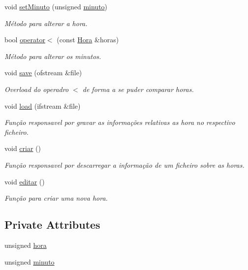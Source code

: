 \begin{DoxyCompactItemize}
void \hyperlink{class_hora_abca266485eb34d8feaf1f9e84854a7f3}{set\+Minuto} (unsigned \hyperlink{class_hora_a9d33ce2d8a3f4b3d05b2a3c6df782fa4}{minuto})
\begin{DoxyCompactList}\small\item\em Método para alterar a hora. \end{DoxyCompactList}\item 
bool \hyperlink{class_hora_a24d925d0c6d35e813542346e5d63eef9}{operator$<$} (const \hyperlink{class_hora}{Hora} \&horas)
\begin{DoxyCompactList}\small\item\em Método para alterar os minutos. \end{DoxyCompactList}\item 
void \hyperlink{class_hora_a61d7bd0b06ffbb4c446be735199c61cb}{save} (ofstream \&file)
\begin{DoxyCompactList}\small\item\em Overload do operadro $<$ de forma a se puder comparar horas. \end{DoxyCompactList}\item 
void \hyperlink{class_hora_a622aa86821d01f80e4117f27529e6879}{load} (ifstream \&file)
\begin{DoxyCompactList}\small\item\em Função responsavel por gravar as informações relativas as hora no respectivo ficheiro. \end{DoxyCompactList}\item 
void \hyperlink{class_hora_a7aa53826fa618dab6f6d1d5f2dc81451}{criar} ()
\begin{DoxyCompactList}\small\item\em Função responsavel por descarregar a informação de um ficheiro sobre as horas. \end{DoxyCompactList}\item 
void \hyperlink{class_hora_acedba833ccd61d7e60ec2c4d0ca95cda}{editar} ()
\begin{DoxyCompactList}\small\item\em Função para criar uma nova hora. \end{DoxyCompactList}\end{DoxyCompactItemize}
\subsection*{Private Attributes}
\begin{DoxyCompactItemize}
\item 
unsigned \hyperlink{class_hora_ab901e62ae1158965687dc736a45ee8fe}{hora}
\item 
unsigned \hyperlink{class_hora_a9d33ce2d8a3f4b3d05b2a3c6df782fa4}{minuto}
\end{DoxyCompactItemize}
